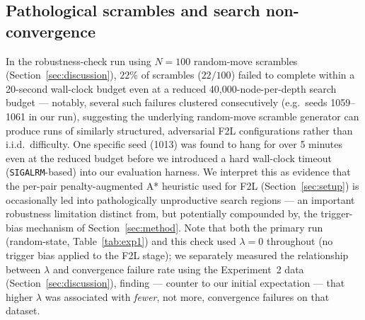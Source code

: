 \documentclass[10pt,conference]{article}
\begin{document}
\subsection{Pathological scrambles and search non-convergence}
\label{sec:pathological}
In the robustness-check run using $N=100$ random-move scrambles
(Section~\ref{sec:discussion}), $22\%$ of scrambles ($22/100$) failed to
complete within a 20-second wall-clock budget even at a reduced
40{,}000-node-per-depth search budget --- notably, several such
failures clustered consecutively (e.g.\ seeds 1059--1061 in our
run), suggesting the underlying random-move scramble generator can
produce runs of similarly structured, adversarial F2L configurations
rather than i.i.d.\ difficulty. One specific seed (1013) was found
to hang for over 5 minutes even at the reduced budget before we
introduced a hard wall-clock timeout (\texttt{SIGALRM}-based) into
our evaluation harness. We interpret this as evidence that the
per-pair penalty-augmented A* heuristic used for F2L
(Section~\ref{sec:setup}) is occasionally led into pathologically
unproductive search regions --- an important robustness limitation
distinct from, but potentially compounded by, the trigger-bias
mechanism of Section~\ref{sec:method}. Note that both the primary run
(random-state, Table~\ref{tab:exp1}) and this check used
$\lambda=0$ throughout (no trigger bias applied to the F2L stage);
we separately measured the relationship between $\lambda$ and
convergence failure rate using the Experiment~2 data
(Section~\ref{sec:discussion}), finding --- counter to our initial
expectation --- that higher $\lambda$ was associated with
\emph{fewer}, not more, convergence failures on that dataset.

\end{document}
